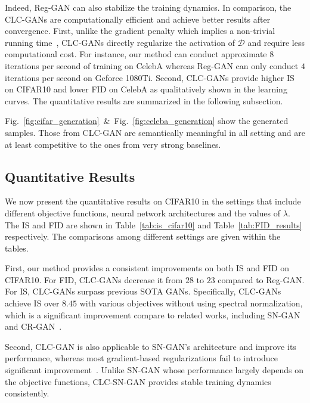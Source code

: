 \documentclass{article}
\newcommand{\xD}{\mathcal{D}}
\newcommand{\fig}[1]{Fig.~\ref{fig:#1}}
\newcommand{\tabl}[1]{Table~\ref{tab:#1}}
\theoremstyle{definition}
\begin{document}
Indeed, Reg-GAN can also stabilize the training dynamics.
In comparison, the CLC-GANs are computationally efficient and achieve better results after convergence.
First, unlike the gradient penalty which implies a non-trivial running time~\cite{kurach2018large}, CLC-GANs directly regularize the activation of $\xD$ and require less computational cost.
For instance, our method can conduct approximate $8$ iterations per second of training on CelebA whereas Reg-GAN can only conduct $4$ iterations per second on Geforce 1080Ti. 
Second, CLC-GANs provide higher IS on CIFAR10 and lower FID on CelebA as qualitatively shown in the learning curves. The quantitative results are summarized in the following subsection.

\fig{cifar_generation}~\&~\fig {celeba_generation} show the generated samples. Those from CLC-GAN are semantically meaningful in all setting and are at least competitive to the ones from very strong baselines.






\subsection{Quantitative Results}
\label{sec:quantative_results}

We now present the quantitative results on CIFAR10 in the settings that include different objective functions, neural network architectures and the values of $\lambda$. The IS and FID are shown in \tabl{is_cifar10} and \tabl{FID_results} respectively. The comparisons among different settings are given within the tables.



First, our method provides a consistent improvements on both IS and FID on CIFAR10. For FID, CLC-GANs decrease it from $28$ to $23$ compared to Reg-GAN. 
For IS, CLC-GANs surpass previous SOTA GANs. Specifically, CLC-GANs achieve IS over $8.45$ with various objectives without using spectral normalization, which is a significant improvement compare to related works, including SN-GAN~\cite{miyato2018spectral} and CR-GAN~\cite{zhang2019consistency}. 

Second, CLC-GAN is also applicable to SN-GAN's architecture and improve its performance, whereas most gradient-based regularizations fail to introduce significant improvement~\cite{kurach2018large}.
Unlike SN-GAN whose performance largely depends on the objective functions, CLC-SN-GAN provides stable training dynamics consistently. 
\end{document}
